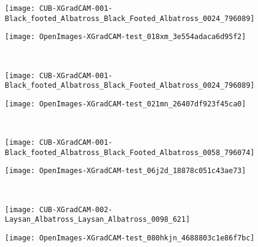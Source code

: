 \documentclass[twocolumn]{article}
\theoremstyle{definition}
\begin{document}
\begin{figure*}
     \centering
     \begin{subfigure}[b]{0.49\textwidth}
         \centering
         \texttt{[image: CUB-XGradCAM-001-Black\_footed\_Albatross\_Black\_Footed\_Albatross\_0024\_796089]}
     \end{subfigure}
     \hfill
     \begin{subfigure}[b]{0.49\textwidth}
         \centering
         \texttt{[image: OpenImages-XGradCAM-test\_018xm\_3e554adaca6d95f2]}
     \end{subfigure}
     \\
     \vspace{0.1cm}
     \begin{subfigure}[b]{0.49\textwidth}
         \centering
         \texttt{[image: CUB-XGradCAM-001-Black\_footed\_Albatross\_Black\_Footed\_Albatross\_0024\_796089]}
     \end{subfigure}
     \hfill
     \begin{subfigure}[b]{0.49\textwidth}
         \centering
         \texttt{[image: OpenImages-XGradCAM-test\_021mn\_26407df923f45ca0]}
     \end{subfigure}
     \\
     \vspace{0.1cm}
     \begin{subfigure}[b]{0.49\textwidth}
         \centering
         \texttt{[image: CUB-XGradCAM-001-Black\_footed\_Albatross\_Black\_Footed\_Albatross\_0058\_796074]}
     \end{subfigure}
     \hfill
     \begin{subfigure}[b]{0.49\textwidth}
         \centering
         \texttt{[image: OpenImages-XGradCAM-test\_06j2d\_18878c051c43ae73]}
     \end{subfigure}
     \\
     \vspace{0.1cm}
     \begin{subfigure}[b]{0.49\textwidth}
         \centering
         \texttt{[image: CUB-XGradCAM-002-Laysan\_Albatross\_Laysan\_Albatross\_0098\_621]}
     \end{subfigure}
     \hfill
     \begin{subfigure}[b]{0.49\textwidth}
         \centering
         \texttt{[image: OpenImages-XGradCAM-test\_080hkjn\_4688803c1e86f7bc]}
     \end{subfigure}
     \\
     \vspace{0.1cm}

\end{figure*}
\end{document}
